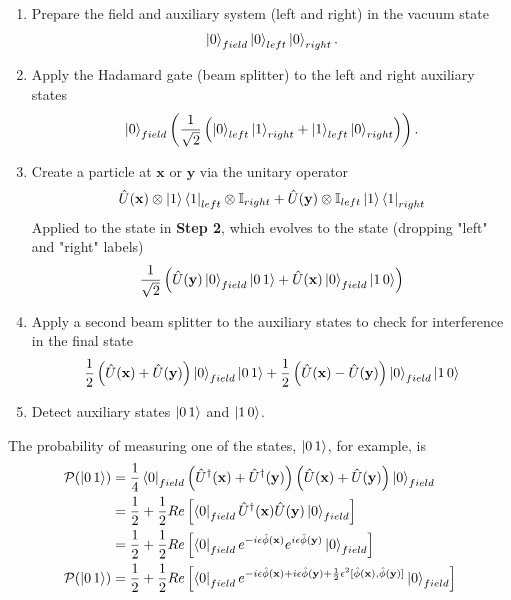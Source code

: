\begin{enumerate}
\item Prepare the field and auxiliary system (left and right) in the vacuum state
	\begin{equation}
	\ket{0}_{field} \ket{0}_{left} \ket{0}_{right}.
	\end{equation}
\item Apply the Hadamard gate (beam splitter) to the left and right auxiliary states
	\begin{equation}
	\ket{0}_{field} \left( \frac{1}{\sqrt{2}} \left( \ket{0}_{left} \ket{1}_{right} + \ket{1}_{left} \ket{0}_{right} \right) \right).
	\end{equation}
\item Create a particle at $\textbf{x}$ or $\textbf{y}$ via the unitary operator
	\begin{equation}
	\hat{U}(\textbf{x}) \otimes \ket{1}\bra{1}_{left} \otimes \mathbb{I}_{right} + \hat{U}(\textbf{y}) \otimes \mathbb{I}_{left} \ket{1}\bra{1}_{right}
	\end{equation}
	Applied to the state in \textbf{Step 2}, which evolves to the state (dropping "left" and "right" labels)
	\begin{equation}
	\frac{1}{\sqrt{2}} \left( \hat{U}(\textbf{y}) \ket{0}_{field} \ket{0 \, 1} + \hat{U}(\textbf{x}) \ket{0}_{field} \ket{1 \, 0} \right)
	\end{equation}
\item Apply a second beam splitter to the auxiliary states to check for interference in the final state
	\begin{equation}
	\frac{1}{2} \left( \hat{U}(\textbf{x}) + \hat{U}(\textbf{y}) \right) \ket{0}_{field} \ket{0 \, 1} + \frac{1}{2} \left( \hat{U}(\textbf{x}) - \hat{U}(\textbf{y}) \right) \ket{0}_{field} \ket{1 \, 0}
	\end{equation}
\item Detect auxiliary states $\ket{0 \, 1}$ and $\ket{1 \, 0}$.  
\end{enumerate}

\noindent The probability of measuring one of the states, $\ket{0 \, 1}$, for example, is 
\begin{align}
\mathcal{P}(\ket{0 \, 1}) &= \frac{1}{4} \bra{0}_{field} \left( \hat{U}^\dagger(\textbf{x}) + \hat{U}^\dagger(\textbf{y}) \right) \left( \hat{U}(\textbf{x}) + \hat{U}(\textbf{y}) \right)  \ket{0}_{field} \\
&= \frac{1}{2} + \frac{1}{2} Re \left[ \bra{0}_{field} \hat{U}^\dagger(\textbf{x}) \hat{U}(\textbf{y}) \ket{0}_{field} \right] \\
&= \frac{1}{2} + \frac{1}{2} Re \left[ \bra{0}_{field} e^{-i \epsilon \hat{\phi}(\textbf{x})} e^{i \epsilon \hat{\phi}(\textbf{y})} \ket{0}_{field} \right] \\
\mathcal{P}(\ket{0 \, 1}) &= \frac{1}{2} + \frac{1}{2} Re \left[ \bra{0}_{field} e^{-i \epsilon \hat{\phi}(\textbf{x})+ i \epsilon \hat{\phi}(\textbf{y}) +\frac{1}{2} \epsilon^2 [ \hat{\phi}(\textbf{x}), \hat{\phi}(\textbf{y}) ] } \ket{0}_{field} \right] \\
\end{align}

